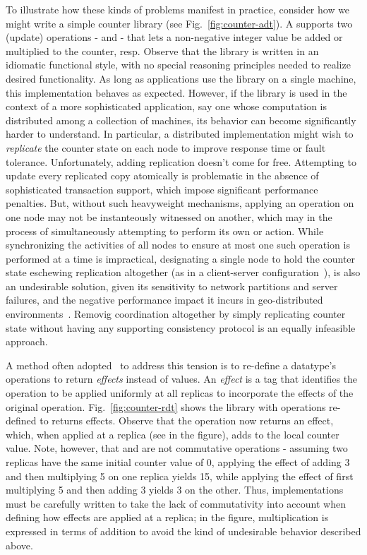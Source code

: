 To illustrate how these kinds of problems manifest in practice,
consider how we might write a simple counter library (see
Fig.~\ref{fig:counter-adt}).  A  supports two (update)
operations -  and  - that lets a non-negative integer
value be added or multiplied to the counter, resp.  Observe that the
library is written in an idiomatic functional style, with no special
reasoning principles needed to realize desired functionality.  As long
as applications use the library on a single machine, this
implementation behaves as expected.  However, if the library is used
in the context of a more sophisticated application, say one whose
computation is distributed among a collection of machines, its
behavior can become significantly harder to understand.  In
particular, a distributed implementation might wish to
\emph{replicate} the counter state on each node to improve response
time or fault tolerance.  Unfortunately, adding replication doesn't
come for free.  Attempting to update every replicated copy atomically
is problematic in the absence of sophisticated transaction support,
which impose significant performance penalties.  But, without such
heavyweight mechanisms, applying an  operation on one node may
not be instanteously witnessed on another, which may in the process of
simultaneously attempting to perform its own  or 
action.  While synchronizing the activities of all nodes to ensure at
most one such operation is performed at a time is impractical,
designating a single node to hold the counter state eschewing
replication altogether (as in a client-server
configuration~\cite{Armstrong}), is also an undesirable solution,
given its sensitivity to network partitions and server failures, and
the negative performance impact it incurs in geo-distributed
environments~\cite{Walter}.  Removig coordination altogether by
simply replicating counter state without having any supporting
consistency protocol is an equally infeasible approach.

A method often adopted~\cite{SPB+11,Burckhardt2014} to address this
tension is to re-define a datatype's operations to return
\emph{effects} instead of values.  An \emph{effect} is a tag that
identifies the operation to be applied uniformly at all replicas to
incorporate the effects of the original
operation. Fig.~\ref{fig:counter-rdt} shows the  library
with operations re-defined to returns effects.  Observe that the
 operation now returns an  effect, which,
when applied at a replica (see  in the figure), adds  to
the local counter value.  Note, however, that  and  are
not commutative operations - assuming two replicas have the same
initial counter value of 0, applying the effect of adding 3 and then
multiplying 5 on one replica yields 15, while applying the effect of
first multiplying 5 and then adding 3 yields 3 on the other.  Thus,
implementations must be carefully written to take the lack of
commutativity into account when defining how effects are applied at a
replica; in the figure, multiplication is expressed in terms of
addition to avoid the kind of undesirable behavior described above.


